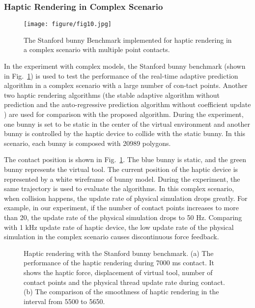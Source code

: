 \documentclass[10pt,journal,cspaper,compsoc]{IEEEtran}
\begin{document}
\subsubsection{Haptic Rendering in Complex Scenario}
\label{sec_5.3.3}

\begin{figure}[!t]
	\centering
	\texttt{[image: figure/fig10.jpg]}
	\caption{The Stanford bunny Benchmark implemented for haptic rendering in a complex scenario with multiple point contacts.}
	\label{fig_bunny}
\end{figure}

In the experiment with complex models, the Stanford bunny benchmark (shown in Fig.~\ref{fig_bunny}) is used to test the performance of the real-time adaptive prediction algorithm in a complex scenario with a large number of con-tact points. Another two haptic rendering algorithms (the stable adaptive algorithm without prediction \cite{no19} and the auto-regressive prediction algorithm without coefficient update \cite{no20}) are used for comparison with the proposed algorithm. During the experiment, one bunny is set to be static in the center of the virtual environment and another bunny is controlled by the haptic device to collide with the static bunny. In this scenario, each bunny is composed with 20989 polygons. 

The contact position is shown in Fig.~\ref{fig_bunny}. The blue bunny is static, and the green bunny represents the virtual tool. The current position of the haptic device is represented by a white wireframe of bunny model. During the experiment, the same trajectory is used to evaluate the algorithms. In this complex scenario, when collision happens, the update rate of physical simulation drops greatly.  For example, in our experiment, if the number of contact points increases to more than 20, the update rate of the physical simulation drops to 50 Hz. Comparing with 1 kHz update rate of haptic device, the low update rate of the physical simulation in the complex scenario causes discontinuous force feedback.

\begin{figure*}[!t]\centering
	\caption{Haptic rendering with the Stanford bunny benchmark. (a) The performance of the haptic rendering during 7000 ms contact. It shows the haptic force, displacement of virtual tool, number of contact points and the physical thread update rate during contact. (b) The comparison of the smoothness of haptic rendering in the interval from 5500 to 5650.}
	\label{fig11_ab}
\end{figure*}
\end{document}
